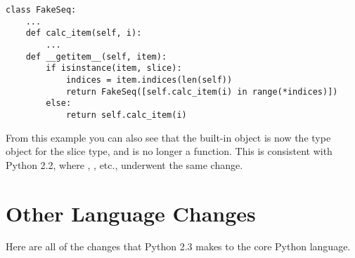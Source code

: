 \documentclass{howto}
\begin{document}
\begin{verbatim}
class FakeSeq:
    ...
    def calc_item(self, i):
        ...
    def __getitem__(self, item):
        if isinstance(item, slice):
            indices = item.indices(len(self))
            return FakeSeq([self.calc_item(i) in range(*indices)])
        else:
            return self.calc_item(i)
\end{verbatim}

From this example you can also see that the built-in 
object is now the type object for the slice type, and is no longer a
function.  This is consistent with Python 2.2, where ,
, etc., underwent the same change.


\section{Other Language Changes}

Here are all of the changes that Python 2.3 makes to the core Python
language.
\end{document}
